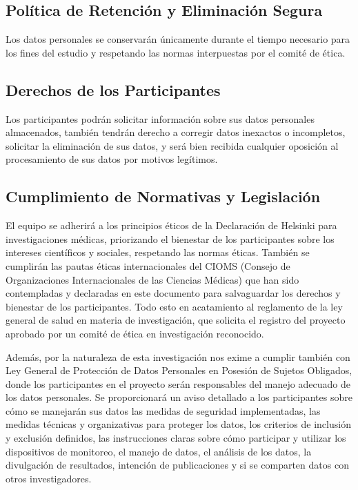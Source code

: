 \subsection{Política de Retención y Eliminación Segura}
\label{subsec:politica_retencion}

Los datos personales se conservarán únicamente durante el tiempo necesario para los fines del estudio y respetando las normas interpuestas por el comité de ética.

\subsection{Derechos de los Participantes}
\label{subsec:derechos_participantes}

Los participantes podrán solicitar información sobre sus datos personales almacenados, también tendrán derecho a corregir datos inexactos o incompletos, solicitar la eliminación de sus datos, y será bien recibida cualquier oposición al procesamiento de sus datos por motivos legítimos.

\subsection{Cumplimiento de Normativas y Legislación}
\label{subsec:cumplimiento_normativas}

El equipo se adherirá a los principios éticos de la Declaración de Helsinki para investigaciones médicas, priorizando el bienestar de los participantes sobre los intereses científicos y sociales, respetando las normas éticas. También se cumplirán las pautas éticas internacionales del CIOMS (Consejo de Organizaciones Internacionales de las Ciencias Médicas) que han sido contempladas y declaradas en este documento para salvaguardar los derechos y bienestar de los participantes. Todo esto en acatamiento al reglamento de la ley general de salud en materia de investigación, que solicita el registro del proyecto aprobado por un comité de ética en investigación reconocido.

Además, por la naturaleza de esta investigación nos exime a cumplir también con Ley General de Protección de Datos Personales en Posesión de Sujetos Obligados, donde los participantes en el proyecto serán responsables del manejo adecuado de los datos personales. Se proporcionará un aviso detallado a los participantes sobre cómo se manejarán sus datos las medidas de seguridad implementadas, las medidas técnicas y organizativas para proteger los datos, los criterios de inclusión y exclusión definidos, las instrucciones claras sobre cómo participar y utilizar los dispositivos de monitoreo, el manejo de datos, el análisis de los datos, la divulgación de resultados, intención de publicaciones y si se comparten datos con otros investigadores.

